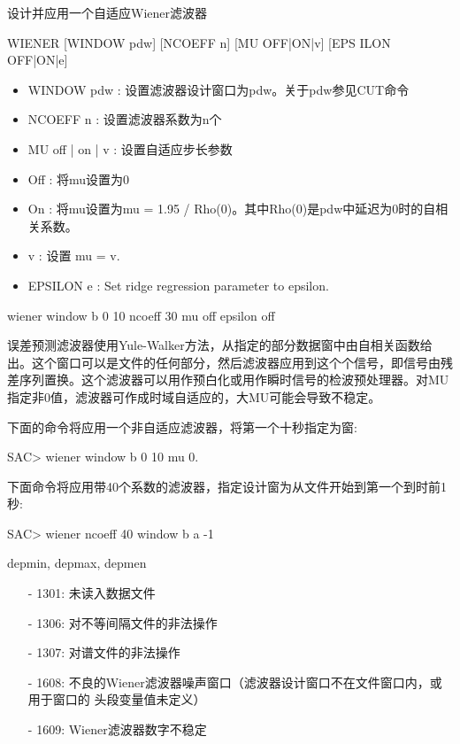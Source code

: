 \label{cmd:wiener}

设计并应用一个自适应Wiener滤波器

\begin{SACSTX}
WIENER [WINDOW pdw] [NCOEFF n] [MU OFF|ON|v] [EPS ILON OFF|ON|e]
\end{SACSTX}

\begin{itemize}
\item WINDOW pdw : 设置滤波器设计窗口为pdw。关于pdw参见CUT命令 
\item NCOEFF n : 设置滤波器系数为n个 
\item MU off | on | v : 设置自适应步长参数 
\item Off : 将mu设置为0 
\item On : 将mu设置为mu = 1.95 / Rho(0)。其中Rho(0)是pdw中延迟为0时的自相关系数。 
\item v : 设置 mu = v. 
\item EPSILON e :  Set ridge regression parameter to epsilon. 
\end{itemize}

\begin{SACDFT}
wiener window b 0 10 ncoeff 30 mu off epsilon off
\end{SACDFT}

误差预测滤波器使用Yule-Walker方法，从指定的部分数据窗中由自相关函数给出。这个窗口可以是文件的任何部分，然后滤波器应用到这个个信号，即信号由残差序列置换。这个滤波器可以用作预白化或用作瞬时信号的检波预处理器。对MU指定非0值，滤波器可作成时域自适应的，大MU可能会导致不稳定。

下面的命令将应用一个非自适应滤波器，将第一个十秒指定为窗:
\begin{SACCode}
SAC> wiener window b 0 10 mu 0.
\end{SACCode}

下面命令将应用带40个系数的滤波器，指定设计窗为从文件开始到第一个到时前1秒:
\begin{SACCode}
SAC> wiener ncoeff 40 window b a -1
\end{SACCode}

depmin, depmax, depmen

\begin{itemize}
\item[-]1301: 未读入数据文件
\item[-]1306: 对不等间隔文件的非法操作
\item[-]1307: 对谱文件的非法操作
\item[-]1608: 不良的Wiener滤波器噪声窗口（滤波器设计窗口不在文件窗口内，或用于窗口的
    头段变量值未定义）
\end{itemize}

\begin{itemize}
\item[-]1609: Wiener滤波器数字不稳定
\end{itemize}

